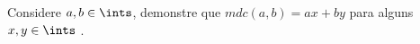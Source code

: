 \begin{exercise}
Considere $a, b \in\ints$, demonstre que $mdc(a,b) = ax + by$ para alguns $x, y \in\ints$ .
\end{exercise}
